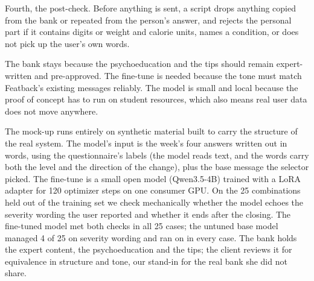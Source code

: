 \documentclass[a4paper]{article}
\begin{document}
Fourth, the post-check. Before anything is sent, a script drops anything copied from the bank or repeated from the person's answer, and rejects the personal part if it contains digits or weight and calorie units, names a condition, or does not pick up the user's own words.

The bank stays because the psychoeducation and the tips should remain expert-written and pre-approved. The fine-tune is needed because the tone must match Featback's existing messages reliably. The model is small and local because the proof of concept has to run on student resources, which also means real user data does not move anywhere.

The mock-up runs entirely on synthetic material built to carry the structure of the real system. The model's input is the week's four answers written out in words, using the questionnaire's labels (the model reads text, and the words carry both the level and the direction of the change), plus the base message the selector picked. The fine-tune is a small open model (Qwen3.5-4B) trained with a LoRA adapter for 120 optimizer steps on one consumer GPU. On the 25 combinations held out of the training set we check mechanically whether the model echoes the severity wording the user reported and whether it ends after the closing. The fine-tuned model met both checks in all 25 cases; the untuned base model managed 4 of 25 on severity wording and ran on in every case. The bank holds the expert content, the psychoeducation and the tips; the client reviews it for equivalence in structure and tone, our stand-in for the real bank she did not share.
\end{document}
